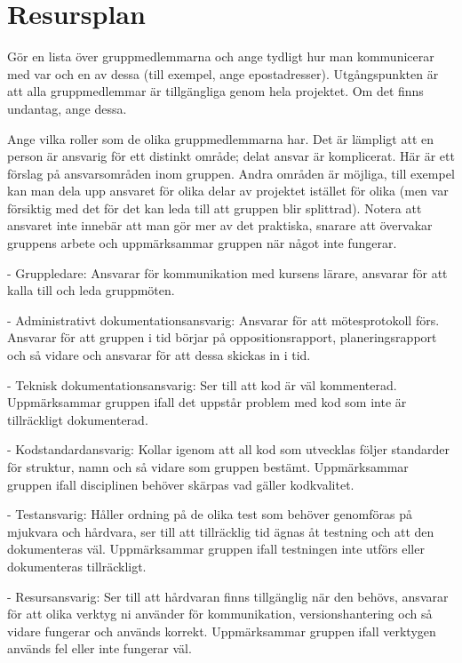 \documentclass[a4paper]{article}
\begin{document}
\section{Resursplan}


Gör en lista över gruppmedlemmarna och ange tydligt hur man kommunicerar
med var och en av dessa (till exempel, ange epostadresser).
Utgångspunkten är att alla gruppmedlemmar är tillgängliga genom hela
projektet. Om det finns undantag, ange dessa.

Ange vilka roller som de olika gruppmedlemmarna har. Det är lämpligt att
en person är ansvarig för ett distinkt område; delat ansvar är
komplicerat. Här är ett förslag på ansvarsområden inom gruppen. Andra
områden är möjliga, till exempel kan man dela upp ansvaret för olika
delar av projektet istället för olika (men var försiktig med det för det
kan leda till att gruppen blir splittrad). Notera att ansvaret inte
innebär att man gör mer av det praktiska, snarare att övervakar gruppens
arbete och uppmärksammar gruppen när något inte fungerar.

-   Gruppledare: Ansvarar för kommunikation med kursens lärare, ansvarar
    för att kalla till och leda gruppmöten.

-   Administrativt dokumentationsansvarig: Ansvarar för att
    mötesprotokoll förs. Ansvarar för att gruppen i tid börjar på
    oppositionsrapport, planeringsrapport och så vidare och ansvarar för
    att dessa skickas in i tid.

-   Teknisk dokumentationsansvarig: Ser till att kod är väl kommenterad.
    Uppmärksammar gruppen ifall det uppstår problem med kod som inte är
    tillräckligt dokumenterad.

-   Kodstandardansvarig: Kollar igenom att all kod som utvecklas följer
    standarder för struktur, namn och så vidare som gruppen bestämt.
    Uppmärksammar gruppen ifall disciplinen behöver skärpas vad
    gäller kodkvalitet.

-   Testansvarig: Håller ordning på de olika test som behöver genomföras
    på mjukvara och hårdvara, ser till att tillräcklig tid ägnas åt
    testning och att den dokumenteras väl. Uppmärksammar gruppen ifall
    testningen inte utförs eller dokumenteras tillräckligt.

-   Resursansvarig: Ser till att hårdvaran finns tillgänglig när den
    behövs, ansvarar för att olika verktyg ni använder för
    kommunikation, versionshantering och så vidare fungerar och
    används korrekt. Uppmärksammar gruppen ifall verktygen används fel
    eller inte fungerar väl.
\end{document}
